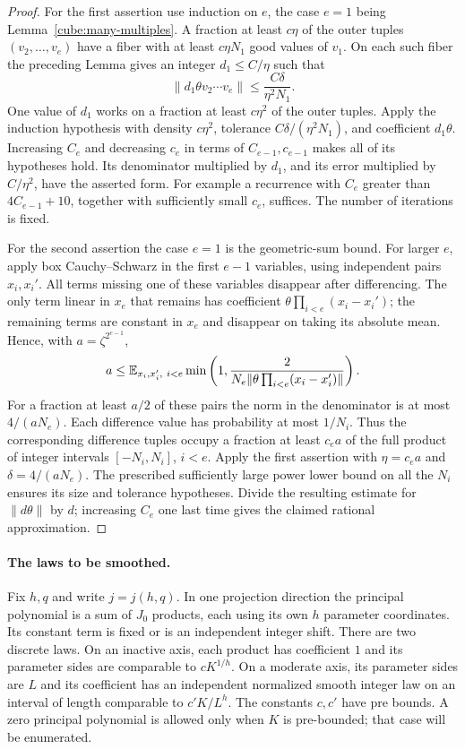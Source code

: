 \begin{proof}
For the first assertion use induction on $e$, the case $e=1$ being
Lemma~\ref{cube:many-multiples}.  A fraction at least $c\eta$ of
the outer tuples $(v_2,\ldots,v_e)$ have a fiber with at least
$c\eta N_1$ good values of $v_1$.  On each such fiber the preceding
Lemma gives an integer $d_1\le C/\eta$ such that
\[
 \|d_1\theta v_2\cdots v_e\|
                    \le \frac{C\delta}{\eta^2N_1}.
\]
One value of $d_1$ works on a fraction at least $c\eta^2$ of the
outer tuples.  Apply the induction hypothesis with density
$c\eta^2$, tolerance $C\delta/(\eta^2N_1)$, and coefficient
$d_1\theta$.  Increasing $C_e$ and decreasing $c_e$ in terms of
$C_{e-1},c_{e-1}$ makes all of its hypotheses hold.  Its denominator
multiplied by $d_1$, and its error multiplied by
$C/\eta^2$, have the asserted form.  For example a recurrence with
$C_e$ greater than $4C_{e-1}+10$, together with sufficiently small
$c_e$, suffices.  The number of iterations is fixed.

For the second assertion the case $e=1$ is the geometric-sum bound.
For larger $e$, apply box Cauchy--Schwarz in the first $e-1$
variables, using independent pairs $x_i,x_i'$.  All terms missing
one of these variables disappear after differencing.  The only term
linear in $x_e$ that remains has coefficient
$\theta\prod_{i<e}(x_i-x_i')$; the remaining terms are constant
in $x_e$ and disappear on taking its absolute mean.  Hence, with
$a=\zeta^{2^{e-1}}$,
\[
 a\le\mathbb E_{x_i,x_i',\ i<e}
 \min\left(1,\frac{2}{N_e
         \|\theta\prod_{i<e}(x_i-x_i')\|}\right).
\]
For a fraction at least $a/2$ of these pairs the norm in the
denominator is at most $4/(aN_e)$.  Each difference value has
probability at most $1/N_i$.  Thus the corresponding difference
tuples occupy a fraction at least $c_ea$ of the full product of
integer intervals $[-N_i,N_i]$, $i<e$.  Apply the first assertion
with $\eta=c_ea$ and $\delta=4/(aN_e)$.  The prescribed sufficiently
large power lower bound on all the $N_i$ ensures its size and
tolerance hypotheses.  Divide the resulting estimate for
$\|d\theta\|$ by $d$; increasing $C_e$ one last time gives the
claimed rational approximation.
\end{proof}

\paragraph{The laws to be smoothed.}
Fix $h,q$ and write $j=j(h,q)$. In one projection direction
the principal polynomial is a sum of $J_0$ products, each using
its own $h$ parameter coordinates. Its constant term is fixed
or is an independent integer shift. There are two discrete laws.
On an inactive axis, each product has coefficient $1$ and its
parameter sides are comparable to $cK^{1/h}$. On a moderate
axis, its parameter sides are $L$ and its coefficient has an
independent normalized smooth integer law on an interval of
length comparable to $c'K/L^h$. The constants $c,c'$ have pre
bounds. A zero principal polynomial is allowed only when $K$
is pre-bounded; that case will be enumerated.

